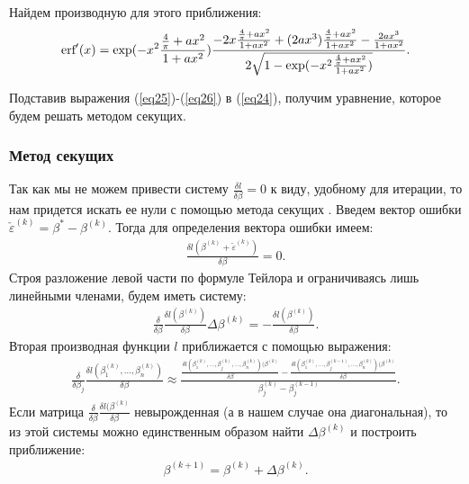 Найдем производную для этого приближения:
\begin{eqnarray}
    \label{eq26}\textup{erf}'(x) = \exp(-x^2 \frac{\frac{4}{\pi}+ax^2}{1+ax^2}) \frac{-2x\frac{\frac{4}{\pi}+ax^2}{1+ax^2}+(2ax^3)\frac{\frac{4}{\pi}+ax^2}{1+ax^2}-\frac{2ax^3}{1+ax^2}}{2\sqrt{1- \exp(-x^2 \frac{\frac{4}{\pi}+ax^2}{1+ax^2})}}.
\end{eqnarray}

Подставив  выражения (\ref{eq25})-(\ref{eq26}) в (\ref{eq24}), получим уравнение, которое будем решать методом секущих.


\subsubsection{Метод секущих}\label{sec4_2}
Так как мы не можем привести систему $ \frac{\delta l}{\delta \beta}=0$ к виду, удобному для итерации, то нам придется искать ее нули с помощью метода секущих \cite{NumericalMethods}.
Введем вектор ошибки $\check{\varepsilon}^{(k)}=\beta^{*}-\beta^{(k)}$. Тогда для определения вектора ошибки имеем:
\begin{eqnarray}
    \frac{\delta l (\beta^{(k)}+\check{\varepsilon}^{(k)})}{\delta \beta}=0.
\end{eqnarray}
Строя разложение левой части по формуле Тейлора и ограничиваясь лишь линейными членами\cite{NumericalMethods}, будем иметь систему:
\begin{eqnarray}
    \frac{\delta }{\delta \beta}\frac{\delta l (\beta^{(k)})}{\delta \beta}\Delta \beta^{(k)}=-\frac{\delta l (\beta^{(k)})}{\delta \beta}.
\end{eqnarray}
Вторая производная функции $l$ приближается с помощью выражения:
\begin{eqnarray}
    \frac{\delta }{\delta \beta_j}\frac{\delta l(\beta_1^{(k)},\dots, \beta_n^{(k)}) }{\delta \beta}\approx \frac{\frac{\delta l(\beta_1^{(k)},\dots,\beta_j^{(k)},\dots, \beta_n^{(k)}) (\beta^{(k)}}{\delta \beta}-\frac{\delta l(\beta_1^{(k)},\dots,\beta_j^{(k-1)},\dots, \beta_n^{(k)}) (\beta^{(k)}}{\delta \beta}}{\beta_j^{(k)}-\beta_j^{(k-1)}}.
\end{eqnarray}
Если матрица $\frac{\delta }{\delta \beta}\frac{\delta l (\beta^{(k)}}{\delta \beta}$ невырожденная (а в нашем случае она диагональная), то из этой системы можно единственным образом найти $\Delta \beta^{(k)}$ и построить приближение:
\begin{eqnarray}
    \beta^{(k+1)}=\beta^{(k)}+\Delta \beta^{(k)}.
\end{eqnarray}

